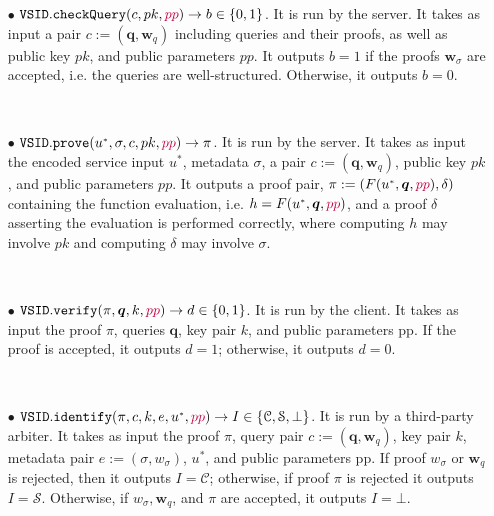 \begin{definition}
\begin{itemize}



\

\item[$\bullet$] $\mathtt{VSID.checkQuery}(c, pk,{\color{purple}pp})\rightarrow b\in\{0,1\}$. It is run by the server. It takes as input a pair $c:=(\bm{q}, \bm{w}_{\scriptscriptstyle q})$ including queries and their proofs, as well as public key $pk$, and {\color{purple}public parameters $pp$}. It outputs $b = 1$ if the proofs $\bm{w}_{\scriptscriptstyle\sigma}$ are accepted, i.e. the queries are well-structured. Otherwise, it outputs $b = 0$.

\

\item[$\bullet$] $\mathtt{VSID.prove}(u^{\scriptscriptstyle *},\sigma,c,pk, {\color{purple} pp})\rightarrow \pi$. It is run by the server. It takes as input the  encoded service input $u^{\scriptscriptstyle *}$, metadata $\sigma$, a pair $c:=(\bm{q},\bm{w}_{\scriptscriptstyle q})$,  public key $pk$, and {\color{purple} public parameters $pp$}. It outputs a proof pair, $\pi:=(F(u^{\scriptscriptstyle *},\bm{q},{\color{purple} pp}),\delta)$ containing the function evaluation, i.e. $h=F(u^{\scriptscriptstyle *},\bm{q},{\color{purple} pp})$, and a proof $\delta$ asserting the evaluation is performed correctly, where computing $h$ may involve $pk$ and computing $\delta$ may involve $\sigma$.


\

\item[$\bullet$] $\mathtt{VSID.verify}(\pi, \bm{q}, k, {\color{purple} pp})\rightarrow d\in\{0,1\}$. It is run by the client. It takes as input the proof $\pi$, queries $\bm{q}$,  key pair $k$, and  {\color{purple} public parameters pp}. If the proof is accepted, it outputs $d=1$; otherwise, it outputs $d=0$. 

\

\item[$\bullet$]  $\mathtt{VSID.identify}(\pi,c,k,e,u^{\scriptscriptstyle *}, {\color{purple} pp})\rightarrow I\in \{ \mathcal{C},\mathcal{S},\bot\}$. It is run by a third-party arbiter. It takes as input the proof $\pi$, query pair $c:=(\bm{q},\bm{w}_{\scriptscriptstyle q})$,  key pair $k$, metadata pair  $e:=(\sigma,w_{\sigma})$,  $u^{\scriptscriptstyle *}$, and {\color{purple} public parameters pp}. If   proof $w_{\scriptscriptstyle\sigma}$ or $\bm{w}_{\scriptscriptstyle q}$  is rejected, then it outputs $I=\mathcal C$; otherwise, if proof $\pi$ is rejected it outputs $I=\mathcal S$.  Otherwise, if  $w_{\scriptscriptstyle\sigma}, \bm{w}_{\scriptscriptstyle q}$, and $\pi$ are accepted, it outputs   $I=\bot$. 


\end{itemize}
\end{definition}
